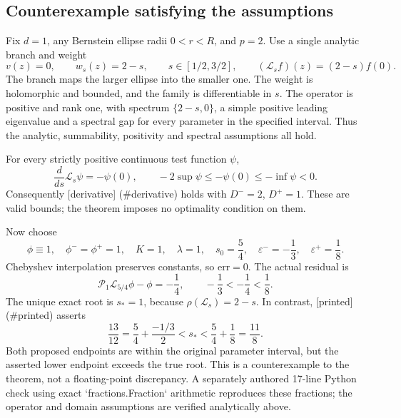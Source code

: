 \documentclass[10pt]{article}
\begin{document}
\subsection*{Counterexample satisfying the assumptions}
Fix \(d=1\), any Bernstein ellipse radii \(0<r<R\), and \(p=2\). Use a single analytic branch and weight \[v(z)=0,\qquad w_s(z)=2-s,\qquad
 s\in[1/2,3/2],\qquad
 (\mathcal L_sf)(z)=(2-s)f(0).\] The branch maps the larger ellipse into the smaller one. The weight is holomorphic and bounded, and the family is differentiable in \(s\). The operator is positive and rank one, with spectrum \(\{2-s,0\}\), a simple positive leading eigenvalue and a spectral gap for every parameter in the specified interval. Thus the analytic, summability, positivity and spectral assumptions all hold.\par
For every strictly positive continuous test function \(\psi\), \[\frac{d}{ds}\mathcal L_s\psi=-\psi(0),\qquad
 -2\sup\psi\le-\psi(0)\le-\inf\psi<0.\] Consequently [derivative] (\#derivative) holds with \(D^-=2\), \(D^+=1\). These are valid bounds; the theorem imposes no optimality condition on them.\par
Now choose \[\phi\equiv1,\quad \phi^-=\phi^+=1,\quad K=1,\quad
 \lambda=1,\quad s_0=\frac54,\quad
 \varepsilon^-=-\frac13,\quad \varepsilon^+=\frac18.\] Chebyshev interpolation preserves constants, so \(\mathrm{err}=0\). The actual residual is \[\mathcal P_1\mathcal L_{5/4}\phi-\phi=-\frac14,
 \qquad -\frac13<-\frac14<\frac18.\] The unique exact root is \(s_*=1\), because \(\rho(\mathcal L_s)=2-s\). In contrast, [printed] (\#printed) asserts \[\frac{13}{12}
 =\frac54+\frac{-1/3}{2}
 <s_*<
 \frac54+\frac18=\frac{11}{8}.\] Both proposed endpoints are within the original parameter interval, but the asserted lower endpoint exceeds the true root. This is a counterexample to the theorem, not a floating-point discrepancy. A separately authored 17-line Python check using exact `fractions.Fraction` arithmetic reproduces these fractions; the operator and domain assumptions are verified analytically above.\par
\end{document}
